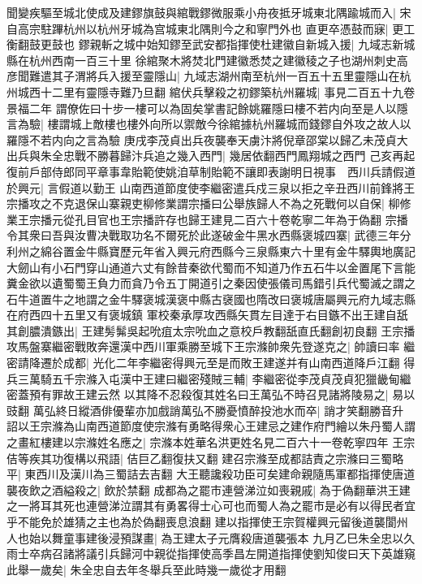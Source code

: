 聞變疾驅至城北使成及建鏐旗鼓與綰戰鏐微服乘小舟夜抵牙城東北隅踰城而入|{
	宋自高宗駐蹕杭州以杭州牙城為宫城東北隅則今之和寧門外也}
直更卒憑鼓而寐|{
	更工衡翻鼓更鼓也}
鏐親斬之城中始知鏐至武安都指揮使杜建徽自新城入援|{
	九域志新城縣在杭州西南一百三十里}
徐綰聚木將焚北門建徽悉焚之建徽稜之子也湖州刺史高彦聞難遣其子渭將兵入援至靈隱山|{
	九域志湖州南至杭州一百五十五里靈隱山在杭州城西十二里有靈隱寺難乃旦翻}
綰伏兵擊殺之初鏐築杭州羅城|{
	事見二百五十九卷景福二年}
謂僚佐曰十步一樓可以為固矣掌書記餘姚羅隱曰樓不若内向至是人以隱言為驗|{
	樓謂城上敵樓也樓外向所以禦敵今徐綰據杭州羅城而錢鏐自外攻之故人以羅隱不若内向之言為驗}
庚戌李茂貞出兵夜襲奉天虜汴將倪章邵棠以歸乙未茂貞大出兵與朱全忠戰不勝暮歸汴兵追之幾入西門|{
	幾居依翻西門鳳翔城之西門}
己亥再起復前戶部侍郎同平章事韋貽範使姚洎草制貽範不讓即表謝明日視事　西川兵請假道於興元|{
	言假道以勤王}
山南西道節度使李繼密遣兵戍三泉以拒之辛丑西川前鋒將王宗播攻之不克退保山寨親吏柳修業謂宗播曰公舉族歸人不為之死戰何以自保|{
	柳修業王宗播元從孔目官也王宗播許存也歸王建見二百六十卷乾寧二年為于偽翻}
宗播令其衆曰吾與汝曹决戰取功名不爾死於此遂破金牛黑水西縣褒城四寨|{
	武德三年分利州之綿谷置金牛縣寶歷元年省入興元府西縣今三泉縣東六十里有金牛驛輿地廣記大劒山有小石門穿山通道六丈有餘昔秦欲代蜀而不知道乃作五石牛以金置尾下言能糞金欲以遺蜀蜀王負力而貪乃令五丁開道引之秦因使張儀司馬錯引兵代蜀滅之謂之石牛道置牛之地謂之金牛驛褒城漢褒中縣古襃國也隋改曰褒城唐屬興元府九域志縣在府西四十五里又有褒城鎮}
軍校秦承厚攻西縣矢貫左目達于右目鏃不出王建自舐其創膿潰鏃出|{
	王建髣髴吳起吮疽太宗吮血之意校戶教翻舐直氏翻創初良翻}
王宗播攻馬盤寨繼密戰敗奔還漢中西川軍乘勝至城下王宗滌帥衆先登遂克之|{
	帥讀曰率}
繼密請降遷於成都|{
	光化二年李繼密得興元至是而敗王建遂并有山南西道降戶江翻}
得兵三萬騎五千宗滌入屯漢中王建曰繼密殘賊三輔|{
	李繼密從李茂貞茂貞犯獵畿甸繼密蓋預有罪故王建云然}
以其降不忍殺復其姓名曰王萬弘不時召見諸將陵易之|{
	易以豉翻}
萬弘終日縱酒俳優輩亦加戲誚萬弘不勝憂憤醉投池水而卒|{
	誚才笑翻勝音升}
詔以王宗滌為山南西道節度使宗滌有勇略得衆心王建忌之建作府門繪以朱丹蜀人謂之畫紅樓建以宗滌姓名應之|{
	宗滌本姓華名洪更姓名見二百六十一卷乾寧四年}
王宗佶等疾其功復構以飛語|{
	佶巨乙翻復扶又翻}
建召宗滌至成都詰責之宗滌曰三蜀略平|{
	東西川及漢川為三蜀詰去吉翻}
大王聽讒殺功臣可矣建命親隨馬軍都指揮使唐道襲夜飲之酒縊殺之|{
	飲於禁翻}
成都為之罷市連營涕泣如喪親戚|{
	為于偽翻華洪王建之一將耳其死也連營涕泣謂其有勇畧得士心可也而蜀人為之罷市是必有以得民者宜乎不能免於雄猜之主也為於偽翻喪息浪翻}
建以指揮使王宗賀權興元留後道襲閬州人也始以舞童事建後浸預謀畫|{
	為王建太子元膺殺唐道襲張本}
九月乙巳朱全忠以久雨士卒病召諸將議引兵歸河中親從指揮使高季昌左開道指揮使劉知俊曰天下英雄窺此舉一歲矣|{
	朱全忠自去年冬舉兵至此時幾一歲從才用翻}
